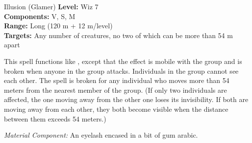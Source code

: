 {Illusion (Glamer)}
{
	\textbf{Level:}
	Wiz 7\\
	\textbf{Components:}
	V, S, M\\
	\textbf{Range:}
	Long (120 m + 12 m/level)\\
	\textbf{Targets:}
	Any number of creatures, no two of which can be more than 54 m apart\\
}
{
	This spell functions like , except that the effect is mobile with the group and is broken when anyone in the group attacks. Individuals in the group cannot see each other. The spell is broken for any individual who moves more than 54 meters from the nearest member of the group. (If only two individuals are affected, the one moving away from the other one loses its invisibility. If both are moving away from each other, they both become visible when the distance between them exceeds 54 meters.)

	\textit{Material Component:}
	An eyelash encased in a bit of gum arabic.

}

